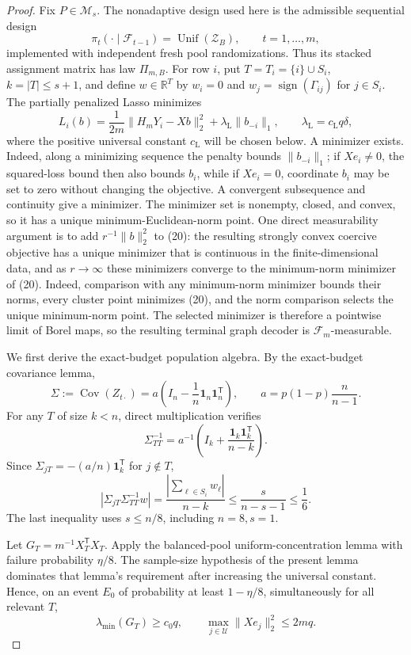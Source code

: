 \documentclass{article}
\begin{document}
\begin{proof}
Fix \(P\in\mathcal M_s\).  The nonadaptive design used here is the admissible sequential design
\[
 \pi_t(\cdot\mid\mathcal F_{t-1})=\operatorname{Unif}(\mathcal Z_B),
 \qquad t=1,\ldots,m, \tag{19}
\]
implemented with independent fresh pool randomizations.  Thus its stacked assignment matrix has law \(\Pi_{m,B}\).  For row \(i\), put \(T=T_i=\{i\}\cup S_i\), \(k=|T|\le s+1\), and define \(w\in\mathbb R^T\) by \(w_i=0\) and \(w_j=\operatorname{sign}(\Gamma_{ij})\) for \(j\in S_i\).  The partially penalized Lasso minimizes
\[
 L_i(b)=\frac1{2m}\lVert H_mY_i-Xb\rVert_2^2
       +\lambda_{\mathrm L}\lVert b_{-i}\rVert_1,
 \qquad \lambda_{\mathrm L}=c_{\mathrm L}q\delta, \tag{20}
\]
where the positive universal constant \(c_{\mathrm L}\) will be chosen below.  A minimizer exists.  Indeed, along a minimizing sequence the penalty bounds \(\lVert b_{-i}\rVert_1\); if \(Xe_i\ne0\), the squared-loss bound then also bounds \(b_i\), while if \(Xe_i=0\), coordinate \(b_i\) may be set to zero without changing the objective.  A convergent subsequence and continuity give a minimizer.  The minimizer set is nonempty, closed, and convex, so it has a unique minimum-Euclidean-norm point.  One direct measurability argument is to add \(r^{-1}\lVert b\rVert_2^2\) to (20): the resulting strongly convex coercive objective has a unique minimizer that is continuous in the finite-dimensional data, and as \(r\to\infty\) these minimizers converge to the minimum-norm minimizer of (20).  Indeed, comparison with any minimum-norm minimizer bounds their norms, every cluster point minimizes (20), and the norm comparison selects the unique minimum-norm point.  The selected minimizer is therefore a pointwise limit of Borel maps, so the resulting terminal graph decoder is \(\mathcal F_m\)-measurable.

We first derive the exact-budget population algebra.  By the exact-budget covariance lemma,
\[
 \Sigma:=\operatorname{Cov}(Z_{t\cdot})
 =a\left(I_n-\frac1n\mathbf1_n\mathbf1_n^{\mathsf T}\right),
 \qquad a=p(1-p)\frac n{n-1}. \tag{21}
\]
For any \(T\) of size \(k<n\), direct multiplication verifies
\[
 \Sigma_{TT}^{-1}=a^{-1}\left(I_k+\frac{\mathbf1_k\mathbf1_k^{\mathsf T}}{n-k}\right). \tag{22}
\]
Since \(\Sigma_{jT}=-(a/n)\mathbf1_k^{\mathsf T}\) for \(j\notin T\),
\[
 \left|\Sigma_{jT}\Sigma_{TT}^{-1}w\right|
 =\frac{|\sum_{\ell\in S_i}w_\ell|}{n-k}
 \le\frac{s}{n-s-1}\le\frac16. \tag{23}
\]
The last inequality uses \(s\le n/8\), including \(n=8,s=1\).

Let \(G_T=m^{-1}X_T^{\mathsf T}X_T\).  Apply the balanced-pool uniform-concentration lemma with failure probability \(\eta/8\).  The sample-size hypothesis of the present lemma dominates that lemma's requirement after increasing the universal constant.  Hence, on an event \(E_0\) of probability at least \(1-\eta/8\), simultaneously for all relevant \(T\),
\[
 \lambda_{\min}(G_T)\ge c_0q,
 \qquad \max_{j\in\mathcal U}\lVert Xe_j\rVert_2^2\le2mq. \tag{24}
\]


\end{proof}
\end{document}
